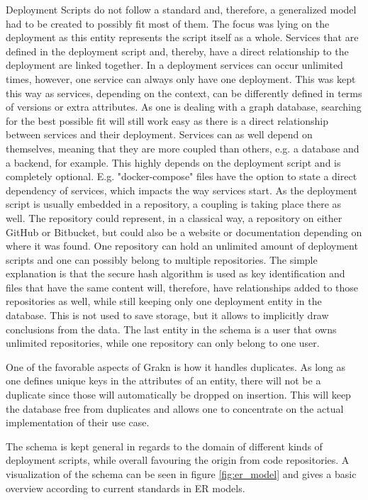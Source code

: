 Deployment Scripts do not follow a standard and, therefore, a generalized model had to be created to possibly fit most of them. The focus was lying on the deployment as this entity represents the script itself as a whole. Services that are defined in the deployment script and, thereby, have a direct relationship to the deployment are linked together. In a deployment services can occur unlimited times, however, one service can always only have one deployment. This was kept this way as services, depending on the context, can be differently defined in terms of versions or extra attributes. As one is dealing with a graph database, searching for the best possible fit will still work easy as there is a direct relationship between services and their deployment.
Services can as well depend on themselves, meaning that they are more coupled than others, e.g. a database and a backend, for example. This highly depends on the deployment script and is completely optional. E.g. "docker-compose" files have the option to state a direct dependency of services, which impacts the way services start.
As the deployment script is usually embedded in a repository, a coupling is taking place there as well. The repository could represent, in a classical way, a repository on either GitHub or Bitbucket, but could also be a website or documentation depending on where it was found. One repository can hold an unlimited amount of deployment scripts and one can possibly belong to multiple repositories. The simple explanation is that the secure hash algorithm is used as key identification and files that have the same content will, therefore, have relationships added to those repositories as well, while still keeping only one deployment entity in the database. This is not used to save storage, but it allows to implicitly draw conclusions from the data. The last entity in the schema is a user that owns unlimited repositories, while one repository can only belong to one user.

One of the favorable aspects of Grakn is how it handles duplicates. As long as one defines unique keys in the attributes of an entity, there will not be a duplicate since those will automatically be dropped on insertion. This will keep the database free from duplicates and allows one to concentrate on the actual implementation of their use case.

The schema is kept general in regards to the domain of different kinds of deployment scripts, while overall favouring the origin from code repositories. A visualization of the schema can be seen in figure \ref{fig:er_model} and gives a basic overview according to current standards in ER models.

